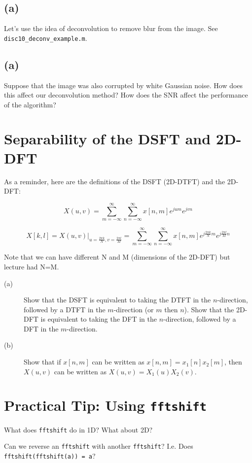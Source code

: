 \documentclass[11pt]{article}
\begin{document}
\subsection*{(a)} Let's use the idea of deconvolution to remove blur from the image. See \texttt{disc10\_deconv\_example.m}.

\subsection*{(a)} Suppose that the image was also corrupted by white Gaussian noise. How does this affect our deconvolution method? How does the SNR affect the performance of the algorithm?

\section{Separability of the DSFT and 2D-DFT}

As a reminder, here are the definitions of the DSFT (2D-DTFT) and the 2D-DFT:

\[ X(u,v) = \sum_{m=-\infty}^\infty \sum_{n=-\infty}^\infty x[n,m] e^{jum}e^{jvn} \]

\[ X[k,l] = X(u,v)\big|_{u = \frac{2 \pi k}{N}, v = \frac{2 \pi l}{M}}  =  \sum_{m=-\infty}^\infty \sum_{n=-\infty}^\infty x[n,m] e^{j\frac{2 \pi k}{N}m}e^{j\frac{2 \pi l}{M}n} \]

Note that we can have different N and M (dimensions of the 2D-DFT) but lecture had N=M. 

\begin{description}
\item[(a)] Show that the DSFT is equivalent to taking the DTFT in the $n$-direction, followed by a DTFT in the $m$-direction (or $m$ then $n$). Show that the 2D-DFT is equivalent to taking the DFT in the $n$-direction, followed by a DFT in the $m$-direction.
\item[(b)] Show that if $x[n,m]$ can be written as $x[n,m]=x_1[n]x_2[m]$, then $X(u,v)$ can be written as $X(u,v)=X_1(u)X_2(v)$.
\end{description}

\section{Practical Tip: Using \texttt{fftshift}}

What does \texttt{fftshift} do in 1D? What about 2D?

Can we reverse an \texttt{fftshift} with another \texttt{fftshift}? I.e. Does \texttt{fftshift(fftshift(a)) = a}?
\end{document}
